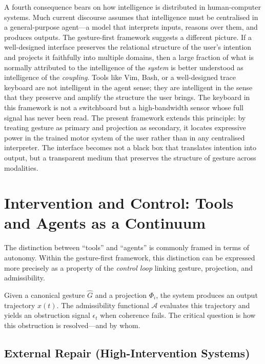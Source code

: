 \documentclass[11pt, a4paper]{article}
\begin{document}
A fourth consequence bears on how intelligence is distributed in
human-computer systems. Much current discourse assumes that intelligence
must be centralised in a general-purpose agent---a model that interprets
inputs, reasons over them, and produces outputs. The gesture-first
framework suggests a different picture. If a well-designed interface
preserves the relational structure of the user's intention and projects
it faithfully into multiple domains, then a large fraction of what is
normally attributed to the intelligence of the \emph{system} is better
understood as intelligence of the \emph{coupling}. Tools like Vim, Bash,
or a well-designed trace keyboard are not intelligent in the agent sense;
they are intelligent in the sense that they preserve and amplify the
structure the user brings. The keyboard in this framework is not a
switchboard but a high-bandwidth sensor whose full signal has never been
read. The present framework extends this principle: by treating gesture
as primary and projection as secondary, it locates expressive power in
the trained motor system of the user rather than in any centralised
interpreter. The interface becomes not a black box that translates
intention into output, but a transparent medium that preserves the
structure of gesture across modalities.

\section{Intervention and Control: Tools and Agents as a Continuum}
\label{sec:control}

The distinction between ``tools'' and ``agents'' is commonly framed in
terms of autonomy. Within the gesture-first framework, this distinction
can be expressed more precisely as a property of the \emph{control loop}
linking gesture, projection, and admissibility.

Given a canonical gesture $\hat{G}$ and a projection $\Phi_i$, the
system produces an output trajectory $x(t)$. The admissibility functional
$\mathcal{A}$ evaluates this trajectory and yields an obstruction signal
$\epsilon_t$ when coherence fails. The critical question is how this
obstruction is resolved---and by whom.

\subsection{External Repair (High-Intervention Systems)}
\end{document}
